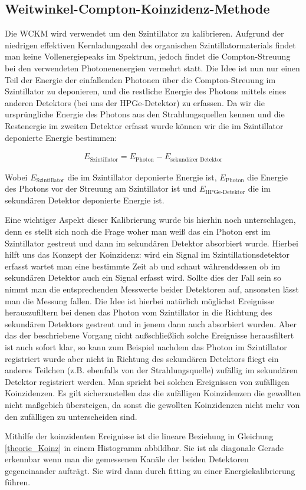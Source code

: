 \subsection{Weitwinkel-Compton-Koinzidenz-Methode}

Die WCKM wird verwendet um den Szintillator zu kalibrieren. Aufgrund der niedrigen effektiven Kernladungszahl des organischen Szintillatormaterials findet man keine Vollenergiepeaks im Spektrum, jedoch findet die Compton-Streuung bei den verwendeten Photonenenergien vermehrt statt. Die Idee ist nun nur einen Teil der Energie der einfallenden Photonen über die Compton-Streuung im Szintillator zu deponieren, und die restliche Energie des Photons mittels eines anderen Detektors (bei uns der HPGe-Detektor) zu erfassen. Da wir die ursprüngliche Energie des Photons aus den Strahlungsquellen kennen und die Restenergie im zweiten Detektor erfasst wurde können wir die im Szintillator deponierte Energie bestimmen:

\begin{gather}
    E_{\text{Szintillator}} = E_{\text{Photon}} - E_{\text{sekundärer Detektor}}
    \label{theorie_Koinz}
\end{gather}

Wobei $E_{\text{Szintillator}}$ die im Szintillator deponierte Energie ist, $E_{\text{Photon}}$ die Energie des Photons vor der Streuung am Szintillator ist und $E_{\text{HPGe-Detektor}}$ die im sekundären Detektor deponierte Energie ist.

Eine wichtiger Aspekt dieser Kalibrierung wurde bis hierhin noch unterschlagen, denn es stellt sich noch die Frage woher man weiß das ein Photon erst im Szintillator gestreut und dann im sekundären Detektor absorbiert wurde. Hierbei hilft uns das Konzept der Koinzidenz: wird ein Signal im Szintillationsdetektor erfasst wartet man eine bestimmte Zeit ab und schaut währenddessen ob im sekundären Detektor auch ein Signal erfasst wird. Sollte dies der Fall sein so nimmt man die entsprechenden Messwerte beider Detektoren auf, ansonsten lässt man die Messung fallen. Die Idee ist hierbei natürlich möglichst Ereignisse herauszufiltern bei denen das Photon vom Szintillator in die Richtung des sekundären Detektors gestreut und in jenem dann auch absorbiert wurden. Aber das der beschriebene Vorgang nicht außschließlich solche Ereignisse herausfiltert ist auch sofort klar, so kann zum Beispiel nachdem das Photon im Szintillator registriert wurde aber nicht in Richtung des sekundären Detektors fliegt ein anderes Teilchen (z.B. ebenfalls von der Strahlungsquelle) zufällig im sekundären Detektor registriert werden. Man spricht bei solchen Ereignissen von zufälligen Koinzidenzen. Es gilt sicherzustellen das die zufälligen Koinzidenzen die gewollten nicht maßgebich übersteigen, da sonst die gewollten Koinzidenzen nicht mehr von den zufälligen zu unterscheiden sind.

Mithilfe der koinzidenten Ereignisse ist die lineare Beziehung in Gleichung \ref{theorie_Koinz} in einem Histogramm abbildbar. Sie ist als diagonale Gerade erkennbar wenn man die gemessenen Kanäle der beiden Detektoren gegeneinander aufträgt. Sie wird dann durch fitting zu einer Energiekalibrierung führen.
